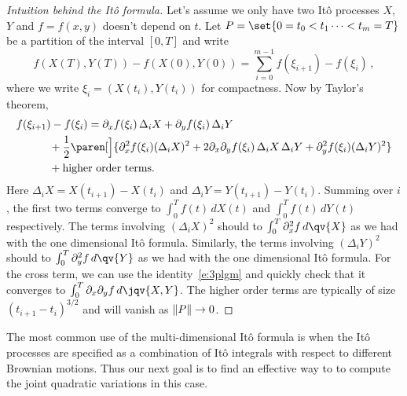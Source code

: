 \begin{proof}[Intuition behind the It\^o formula]
  Let's assume we only have two It\^o processes $X$, $Y$ and $f = f(x, y)$ doesn't depend on $t$.
  Let $P = \set{0 = t_0 < t_1 \cdots < t_m = T}$ be a partition of the interval $[0, T]$ and write
  \begin{equation*}
    f(X(T), Y(T)) - f(X(0), Y(0))
      = \sum_{i=0}^{m-1}
	  f(\xi_{i+1})
	  - f(\xi_i)\,,
  \end{equation*}
  where we write $\xi_i = (X(t_i), Y(t_i))$ for compactness.
  Now by Taylor's theorem,
  \begin{align*}
    \MoveEqLeft
    f(\xi_{i+1}) - f(\xi_i)
      = \partial_x f(\xi_i) \, \Delta_i X
	+ \partial_y f(\xi_i) \, \Delta_i Y
    \\
      &\quad\mathbin+ \frac{1}{2} \paren[\Big]{
	    \partial_x^2 f(\xi_i) (\Delta_i X)^2
	    + 2 \partial_x \partial_y f(\xi_i) \, \Delta_i X \, \Delta_i Y
	    + \partial_y^2 f(\xi_i) (\Delta_i Y)^2
	}
    \\
      &\quad\mathbin + \text{higher order terms.}
  \end{align*}
  Here $\Delta_i X = X(t_{i+1}) - X(t_i)$ and $\Delta_i Y = Y(t_{i+1}) - Y(t_i)$.
  Summing over $i$, the first two terms converge to $\int_0^T f(t) \, dX(t)$ and $\int_0^T f(t) \, dY(t)$ respectively.
  The terms involving $(\Delta_i X)^2$ should to $\int_0^T \partial_x^2 f \, d\qv{X}$ as we had with the one dimensional It\^o formula.
  Similarly, the terms involving $(\Delta_i Y)^2$ should to $\int_0^T \partial_y^2 f \, d\qv{Y}$ as we had with the one dimensional It\^o formula.
  For the cross term, we can use the identity~\eqref{e:3plgm} and quickly check that it converges to $\int_0^T \partial_x \partial_y f \, d\jqv{X, Y}$.
  The higher order terms are typically of size $(t_{i+1} - t_i)^{3/2}$ and will vanish as $\lVert P\rVert \to 0$.
\end{proof}

The most common use of the multi-dimensional It\^o formula is when the It\^o processes are specified as a combination of It\^o integrals with respect to different Brownian motions.
Thus our next goal is to find an effective way to to compute the joint quadratic variations in this case.

